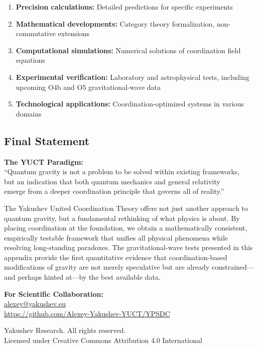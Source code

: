 \documentclass[12pt,a4paper]{article}
\theoremstyle{remark}
\begin{document}
	\begin{enumerate}
		\item \textbf{Precision calculations:} Detailed predictions for specific experiments
		
		\item \textbf{Mathematical developments:} Category theory formalization, non-commutative extensions
		
		\item \textbf{Computational simulations:} Numerical solutions of coordination field equations
		
		\item \textbf{Experimental verification:} Laboratory and astrophysical tests, including upcoming O4b and O5 gravitational-wave data
		
		\item \textbf{Technological applications:} Coordination-optimized systems in various domains
	\end{enumerate}
	
	\subsection{Final Statement}
	
	\begin{center}
		\textbf{The YUCT Paradigm:}\\
		``Quantum gravity is not a problem to be solved within existing frameworks,\\
		but an indication that both quantum mechanics and general relativity\\
		emerge from a deeper coordination principle that governs all of reality.''
	\end{center}
	
	The Yakushev United Coordination Theory offers not just another approach to quantum gravity, but a fundamental rethinking of what physics is about. By placing coordination at the foundation, we obtain a mathematically consistent, empirically testable framework that unifies all physical phenomena while resolving long-standing paradoxes. The gravitational-wave tests presented in this appendix provide the first quantitative evidence that coordination-based modifications of gravity are not merely speculative but are already constrained—and perhaps hinted at—by the best available data.
	
	\begin{center}
		\vspace{1cm}
		\textbf{For Scientific Collaboration:}\\
		\url{alexey@yakushev.eu}\\
		\url{https://github.com/Alexey-Yakushev-YUCT/YPSDC}
		
		\vspace{0.5cm}
		 Yakushev Research. All rights reserved.\\
		Licensed under Creative Commons Attribution 4.0 International
	\end{center}
	
\end{document}
